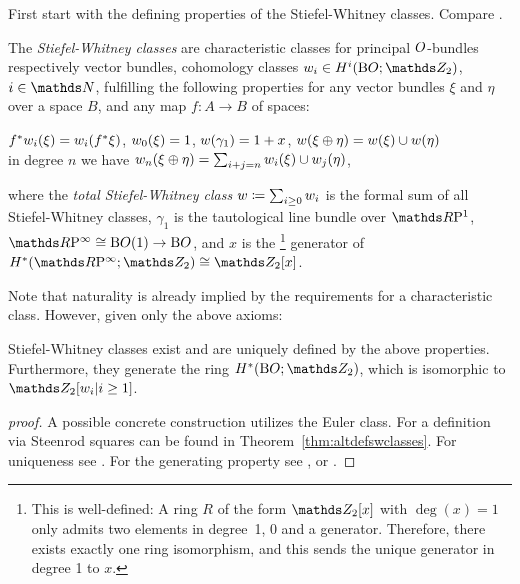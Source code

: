 First start with the defining properties of the Stiefel-Whitney
classes. Compare \forexample \cite[compare §4, p.~37]{milnor}.
\begin{Def}\label{def:swclasses}
  The \emph{Stiefel-Whitney classes} are
  characteristic classes for principal $O$-bundles
  respectively vector bundles,
  \idest cohomology classes
  $\ws{i}\in \H^i(\BO;\Zmod2)$, $i\in\Nat$,
  fulfilling the following properties for any vector bundles $\xi$ and
  $\eta$ over a space $B$, and any map $f\colon A\to B$ of spaces:
  \begin{axioms}
  \axiom[Naturality] ${f}^*{w_{i}}(\xi) = {w_{i}}({f}^* \xi)$,
  \axiom ${w_{0}}(\xi)=1$,
  \axiom ${w}(\gamma_1) = 1 + x$,
  \axiom[Multiplicativity]\label{tag:swclassesmultiplicativity}
  ${w}(\xi \oplus \eta) = {w}(\xi)\cup {w}(\eta)$
    \\\idest in degree $n$ we have
    ${w_{n}}(\xi\oplus\eta) = \sum_{i+j=n}{w_{i}}(\xi) \cup {w_{j}}(\eta)$,
  \end{axioms}
  where the \emph{total Stiefel-Whitney class}
  $w\coloneqq\sum_{i\geq 0}w_{i}$ is the formal sum of all
  Stiefel-Whitney classes,
  $\gamma_1$ is the tautological line bundle over $\RP 1$,
  $\RPinf\cong\BO(1)\to\BO$,
  and $x$ is the%
  \footnote{
    This is well-defined: A ring $R$ of the form $\Zmod2[x]$
    with $\deg(x)=1$ only admits two elements in degree~1, $0$ and a
    generator. Therefore, there exists exactly one ring
    isomorphism, and this sends the unique generator in
    degree 1 to $x$.
  }
  generator of $\H^*(\RPinf;\Zmod2)\cong\Zmod2[x]$.
\end{Def}
Note that naturality is already implied by the requirements for a
characteristic class. However, given only the above axioms:
\begin{Thm}
  Stiefel-Whitney classes exist and are uniquely defined by the above
  properties. Furthermore, they generate the ring
  $\H^*(\BO;\Zmod2)$, which is isomorphic to $\Zmod2[\ws{i}|i\geq1]$.
  \begin{proof}[proof]
      A possible concrete construction utilizes the Euler
      class. For a definition via Steenrod squares can be 
      found in Theorem~\ref{thm:altdefswclasses}.
      For uniqueness see \cite[Uniqueness Theorem~7.3]{milnor}.
      For the generating property see \forexample
      \cite[Theorem~7.1~ff.]{milnor}, or \cite[Chap.~7.6]{may}.
  \end{proof}
\end{Thm}

